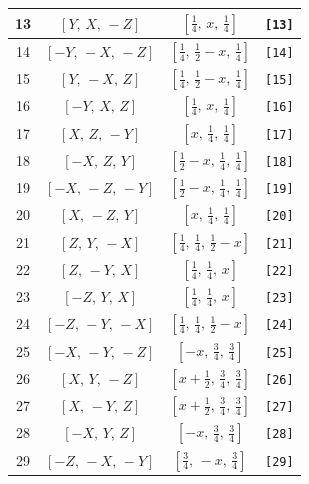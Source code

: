 \documentclass[fleqn,8pt]{jsarticle}
\begin{document}
\begin{longtable}{cccc}
13 & $\left[ Y,\, X,\, - Z \right]$ & $\left[ \frac{1}{4},\, x,\, \frac{1}{4} \right]$ & {\tt [13]} \\ \hline
14 & $\left[ - Y,\, - X,\, - Z \right]$ & $\left[ \frac{1}{4},\, \frac{1}{2} - x,\, \frac{1}{4} \right]$ & {\tt [14]} \\ \hline
15 & $\left[ Y,\, - X,\, Z \right]$ & $\left[ \frac{1}{4},\, \frac{1}{2} - x,\, \frac{1}{4} \right]$ & {\tt [15]} \\ \hline
16 & $\left[ - Y,\, X,\, Z \right]$ & $\left[ \frac{1}{4},\, x,\, \frac{1}{4} \right]$ & {\tt [16]} \\ \hline
17 & $\left[ X,\, Z,\, - Y \right]$ & $\left[ x,\, \frac{1}{4},\, \frac{1}{4} \right]$ & {\tt [17]} \\ \hline
18 & $\left[ - X,\, Z,\, Y \right]$ & $\left[ \frac{1}{2} - x,\, \frac{1}{4},\, \frac{1}{4} \right]$ & {\tt [18]} \\ \hline
19 & $\left[ - X,\, - Z,\, - Y \right]$ & $\left[ \frac{1}{2} - x,\, \frac{1}{4},\, \frac{1}{4} \right]$ & {\tt [19]} \\ \hline
20 & $\left[ X,\, - Z,\, Y \right]$ & $\left[ x,\, \frac{1}{4},\, \frac{1}{4} \right]$ & {\tt [20]} \\ \hline
21 & $\left[ Z,\, Y,\, - X \right]$ & $\left[ \frac{1}{4},\, \frac{1}{4},\, \frac{1}{2} - x \right]$ & {\tt [21]} \\ \hline
22 & $\left[ Z,\, - Y,\, X \right]$ & $\left[ \frac{1}{4},\, \frac{1}{4},\, x \right]$ & {\tt [22]} \\ \hline
23 & $\left[ - Z,\, Y,\, X \right]$ & $\left[ \frac{1}{4},\, \frac{1}{4},\, x \right]$ & {\tt [23]} \\ \hline
24 & $\left[ - Z,\, - Y,\, - X \right]$ & $\left[ \frac{1}{4},\, \frac{1}{4},\, \frac{1}{2} - x \right]$ & {\tt [24]} \\ \hline
25 & $\left[ - X,\, - Y,\, - Z \right]$ & $\left[ - x,\, \frac{3}{4},\, \frac{3}{4} \right]$ & {\tt [25]} \\ \hline
26 & $\left[ X,\, Y,\, - Z \right]$ & $\left[ x + \frac{1}{2},\, \frac{3}{4},\, \frac{3}{4} \right]$ & {\tt [26]} \\ \hline
27 & $\left[ X,\, - Y,\, Z \right]$ & $\left[ x + \frac{1}{2},\, \frac{3}{4},\, \frac{3}{4} \right]$ & {\tt [27]} \\ \hline
28 & $\left[ - X,\, Y,\, Z \right]$ & $\left[ - x,\, \frac{3}{4},\, \frac{3}{4} \right]$ & {\tt [28]} \\ \hline
29 & $\left[ - Z,\, - X,\, - Y \right]$ & $\left[ \frac{3}{4},\, - x,\, \frac{3}{4} \right]$ & {\tt [29]} \\ \hline

\end{longtable}
\end{document}

